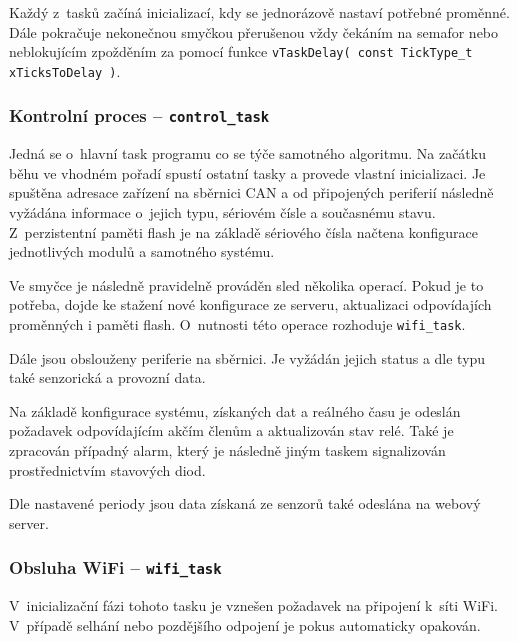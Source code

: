         Každý z~tasků začíná inicializací, kdy se jednorázově nastaví potřebné proměnné. Dále pokračuje nekonečnou smyčkou přerušenou vždy čekáním na semafor nebo neblokujícím zpožděním za pomocí funkce \texttt{vTaskDelay( const TickType\_t xTicksToDelay )}.

        
        \subsubsection{Kontrolní proces -- \texttt{control\_task}}
            Jedná se o~hlavní task programu co se týče samotného algoritmu. Na začátku běhu ve vhodném pořadí spustí ostatní tasky a provede vlastní inicializaci. Je spuštěna adresace zařízení na sběrnici CAN a od připojených periferií následně vyžádána informace o~jejich typu, sériovém čísle a současnému stavu. Z~perzistentní paměti flash je na základě sériového čísla načtena konfigurace jednotlivých modulů a samotného systému. 

            Ve smyčce je následně pravidelně prováděn sled několika operací. Pokud je to potřeba, dojde ke stažení nové konfigurace ze serveru, aktualizaci odpovídajích proměnných i paměti flash.  O~nutnosti této operace rozhoduje \texttt{wifi\_task}.

            Dále jsou obslouženy periferie na sběrnici. Je vyžádán jejich status a dle typu také senzorická a provozní data. 

            Na základě konfigurace systému, získaných dat a reálného času je odeslán požadavek odpovídajícím akčím členům a aktualizován stav relé. Také je zpracován případný alarm, který je následně jiným taskem signalizován prostřednictvím stavových diod. 

            Dle nastavené periody jsou data získaná ze senzorů také odeslána na webový server.

        \subsubsection{Obsluha WiFi --  \texttt{wifi\_task}}
            V~inicializační fázi tohoto tasku je vznešen požadavek na připojení k~síti WiFi. V~případě selhání nebo pozdějšího odpojení je pokus automaticky opakován. 
            
